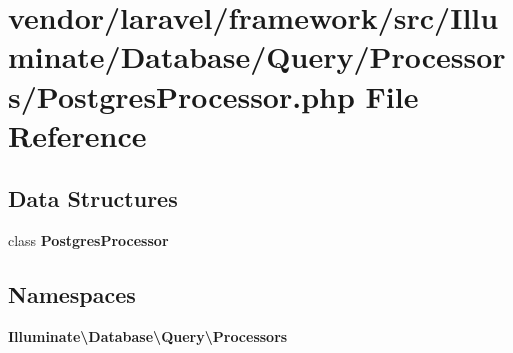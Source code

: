 \section{vendor/laravel/framework/src/\+Illuminate/\+Database/\+Query/\+Processors/\+Postgres\+Processor.php File Reference}
\label{_postgres_processor_8php}
\subsection*{Data Structures}
\begin{DoxyCompactItemize}
\item 
class {\bf Postgres\+Processor}
\end{DoxyCompactItemize}
\subsection*{Namespaces}
\begin{DoxyCompactItemize}
\item 
 {\bf Illuminate\textbackslash{}\+Database\textbackslash{}\+Query\textbackslash{}\+Processors}
\end{DoxyCompactItemize}
